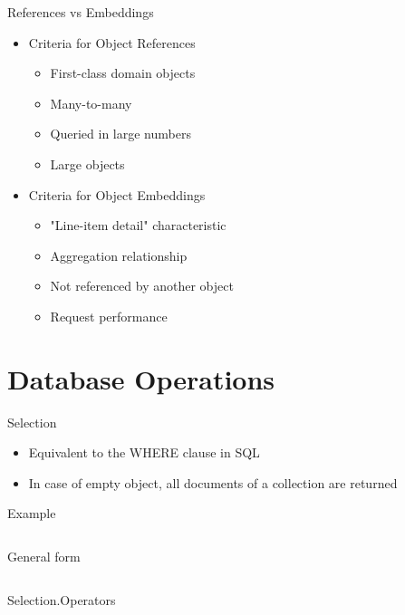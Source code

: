 \documentclass[sans]{beamer}
\begin{document}
\begin{frame}{References vs Embeddings}
	\begin{itemize}
		\item Criteria for Object References
		\begin{itemize}
			\item First-class domain objects
			\item Many-to-many
			\item Queried in large numbers
			\item Large objects
		\end{itemize}

		\item Criteria for Object Embeddings
		\begin{itemize}
			\item "Line-item detail" characteristic
			\item Aggregation relationship
			\item Not referenced by another object
			\item Request performance
		\end{itemize}
	\end{itemize}
\end{frame}

\section{Database Operations}

\begin{frame}{Selection}
	\begin{itemize}
		\item Equivalent to the WHERE clause in SQL
		\item In case of empty object, all documents of a collection are returned
	\end{itemize}
	
	\begin{block}{Example}
		\inputminted[fontsize=\footnotesize]{js}{codes/selection.js}
	\end{block}
	
	\begin{block}{General form}
		\inputminted[fontsize=\footnotesize]{js}{codes/selectionGen.js}
	\end{block}
\end{frame}

\begin{frame}{Selection.Operators}
	\inputminted[fontsize=\footnotesize]{js}{codes/selectionOp.js}		
\end{frame}
\end{document}
